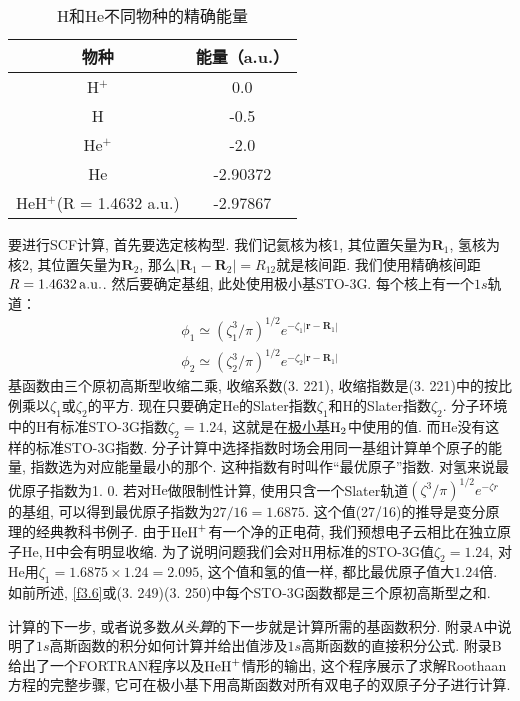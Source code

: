 \begin{table}[H]
	\centering
	\caption{H和He不同物种的精确能量}
	\begin{tabular}{cc}
		\hline
		物种 & 能量（a.u.）\\\hline
		H$^+$      & 0.0\\
		H     & -0.5\\
		He$^+$     & -2.0\\
		He     & -2.90372\\
		HeH$^+$(R = 1.4632 a.u.)&-2.97867\\\hline
	\end{tabular}
	\label{t3.4}
\end{table}
要进行SCF计算, 
首先要选定核构型. 
我们记氦核为核1, 
其位置矢量为$\mathbf{R}_1$, 
氢核为核2, 
其位置矢量为$\mathbf{R}_2$, 
那么$|\mathbf{R}_1-\mathbf{R}_2|=R_{12}$就是核间距. 
我们使用精确核间距$R=1.4632\,\mathrm{a.u.}$. 
然后要确定基组, 
此处使用极小基STO-3G. 
每个核上有一个$1s$轨道：
\begin{align}
	\phi_1 \simeq (\zeta_1^3/\pi)^{1/2} e^{-\zeta_1|\mathbf{r-R}_1|}\\
	\phi_2 \simeq (\zeta_2^3/\pi)^{1/2} e^{-\zeta_2|\mathbf{r-R}_1|}
\end{align}
基函数由三个原初高斯型收缩二乘, 
收缩系数(3.
221), 
收缩指数是(3.
221)中的按比例乘以$\zeta_1$或$\zeta_2$的平方. 
现在只要确定$\mathrm{He}$的Slater指数$\zeta_1$和$\mathrm{H}$的Slater指数$\zeta_2$. 
分子环境中的$\mathrm{H}$有标准STO-3G指数$\zeta_2=1.24$, 
这就是在\underline{极小基$\mathrm{H}_2$}中使用的值. 
而$\mathrm{He}$没有这样的标准STO-3G指数. 
分子计算中选择指数时场会用同一基组计算单个原子的能量, 
指数选为对应能量最小的那个. 
这种指数有时叫作``最优原子''指数. 
对氢来说最优原子指数为1.
0. 
若对$\mathrm{He}$做限制性\hft 计算, 
使用只含一个Slater轨道$(\zeta^3/\pi)^{1/2}e^{-\zeta r}$的基组, 
可以得到最优原子指数为$27/16=1.6875$. 
这个值(27/16)的推导是变分原理的经典教科书例子. 
由于$\mathrm{HeH}^+$有一个净的正电荷, 
我们预想电子云相比在独立原子$\mathrm{He,H}$中会有明显收缩. 
为了说明问题我们会对$\mathrm{H}$用标准的STO-3G值$\zeta_2=1.24$, 
对$\mathrm{He}$用$\zeta_1=1.6875\times 1.24=2.095$, 
这个值和氢的值一样, 
都比最优原子值大$1.24$倍. 
如前所述, 
\ref{f3.6}或(3.
249)(3.
250)中每个STO-3G函数都是三个原初高斯型之和.


计算的下一步, 
或者说多数\emph{从头算}的下一步就是计算所需的基函数积分. 
附录A中说明了$1s$高斯函数的积分如何计算并给出值涉及$1s$高斯函数的直接积分公式. 
附录B给出了一个FORTRAN程序以及$\mathrm{HeH}^+$情形的输出, 
这个程序展示了求解Roothaan方程的完整步骤, 
它可在极小基下用高斯函数对所有双电子的双原子分子进行计算. 

